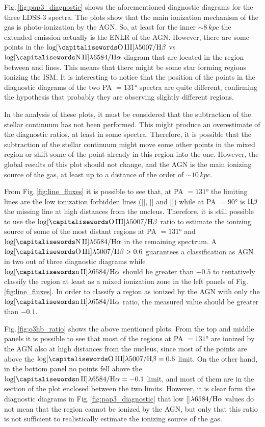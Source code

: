 \documentclass[../thesis.tex]{subfiles}
\begin{document}
Fig.\,\ref{fig:pap3_diagnostic} shows the aforementioned diagnostic diagrams for the three LDSS-3 spectra.
The plots show that the main ionization mechanism of the gas is photo-ionization by the AGN.
So, at least for the inner $\sim 8\,\si{kpc}$ the extended emission actually is the ENLR of the AGN.
However, there are some points in the $\log [\rm \ion{O}{III}]\lambda5007/\Hb$ vs $\log [\rm \ion{N}{II}]\lambda6584/\Ha$ diagram that are located in the region between \citet{Kewley01} and \citet{Kauffmann03} lines.
This means that there might be some star forming regions ionizing the ISM.
It is interesting to notice that the position of the points in the diagnostic diagrams of the two PA $=\ang{131}$ spectra are quite different, confirming the hypothesis that probably they are observing slightly different regions. 

In the analysis of these plots, it must be considered that the subtraction of the stellar continuum has not been performed.
This might produce an overestimate of the diagnostic ratios, at least in some spectra.
Therefore, it is possible that the subtraction of the stellar continuum might move some other points in the mixed region or shift some of the point already in this region into the  one.
However, the global results of this plot should not change, and the AGN is the main ionizing source of the gas, at least up to a distance of the order of $\sim 10\,\si{kpc}$.

From Fig.\,\ref{fig:line_fluxes} it is possible to see that, at PA $=\ang{131}$ the limiting lines are the low ionization forbidden lines ([], [] and []) while at PA $=\ang{90}$ is $\rm H\beta$ the missing line at high distances from the nucleus.
Therefore, it is still possible to use the $\log[\rm \ion{O}{III}]\lambda5007/\Hb$ ratio to estimate the ionizing source of some of the most distant regions at PA $=\ang{131}$ and  $\log[\rm \ion{N}{II}]\lambda6584/\Ha$ in the remaining spectrum.
A $\log[\rm \ion{O}{III}]\lambda5007/\Hb>0.6$
guarantees a classification as AGN in two out of three diagnostic diagrams while $\log[\rm \ion{n}{II}]\lambda6584/\Ha$ should be greater than $-0.5$ to tentatively classify the region at least as a mixed ionization zone in the left panels of Fig.\,\ref{fig:line_fluxes}.
In order to classify a region as ionized by the AGN with only the $\log[\rm \ion{n}{II}]\lambda6584/\Ha$ ratio, the measured value should be greater than $-0.1$.

Fig.\,\ref{fig:o3hb_ratio} shows the above mentioned plots.
From the top and middle panels it is possible to see that most of the regions at PA $=\ang{131}$ are ionized by the AGN also at high distances from the nucleus, since most of the points are above the $\log[\rm \ion{O}{III}]\lambda5007/\Hb=0.6$ limit.
On the other hand, in the bottom panel no points fell above the $\log[\rm \ion{n}{II}]\lambda6584/\Ha=-0.1$ limit, and most of them are in the section of the plot enclosed between the two limits.
However, it is clear form the diagnostic diagrams in Fig.\,\ref{fig:pap3_diagnostic} that low []$\lambda6584/\rm H\alpha$ values do not mean that the region cannot be ionized by the AGN, but only that this ratio is not sufficient to realistically estimate the ionizing source of the gas.
\end{document}
